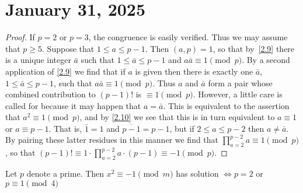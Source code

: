 \documentclass[11pt]{article}
\begin{document}
\section{January 31, 2025}
\begin{proof}
	If \(p = 2\) or \(p = 3\), the congruence is easily verified. Thus we may assume that \(p \geq 5\). Suppose that \(1 \leq a \leq p - 1\). Then \((a, p) = 1\), so that by~\cref{2.9} there is a unique integer \(\bar{a}\) such that \(1 \leq \bar{a} \leq p - 1\) and \(a\bar{a} \equiv 1 \pmod{p}\). By a second application of \cref{2.9} we find that if \(a\) is given then there is exactly one \(\bar{a}\), \(1 \leq \bar{a} \leq p - 1\), such that \(a\bar{a} \equiv 1 \pmod{p}\). Thus \(a\) and \(\bar{a}\) form a pair whose combined contribution to \((p - 1)!\) is \(\equiv 1 \pmod{p}\). However, a little care is called for because it may happen that \(a = \bar{a}\). This is equivalent to the assertion that \(a^2 \equiv 1 \pmod{p}\), and by \cref{2.10} we see that this is in turn equivalent to \(a \equiv 1\) or \(a \equiv p - 1\). That is, \(\bar{1} = 1\) and \(\overline{p - 1} = p - 1\), but if \(2 \leq a \leq p - 2\) then \(a \neq \bar{a}\). By pairing these latter residues in this manner we find that \(\prod_{a=2}^{p-2} a \equiv 1 \pmod{p}\), so that \((p - 1)! \equiv 1 \cdot \prod_{a=2}^{p-2} a \cdot (p - 1) \equiv -1 \pmod{p}\).
\end{proof}
\begin{theorem}\label{2.12}
	Let \(p\) denote a prime. Then \(x^2 \equiv -1 \pmod {m}\) has solution \(\Longleftrightarrow p = 2\) or \(p \equiv 1 \pmod{4}\)
\end{theorem}
\end{document}
